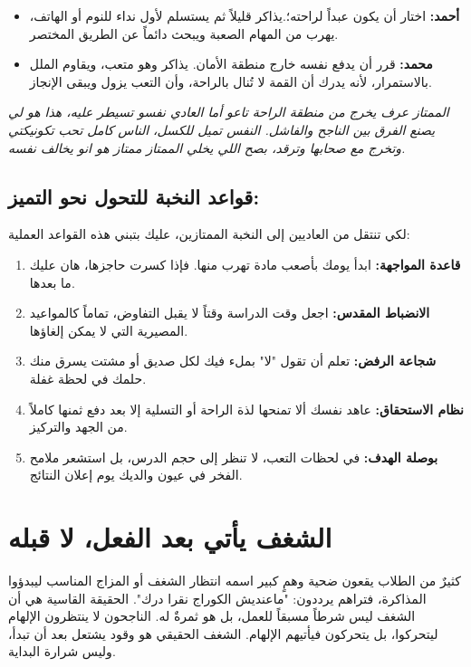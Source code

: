 \documentclass[12pt,a4paper]{book}
\newcommand{\quoteAr}[1]{%
	\begin{myquote}
		\itshape #1
	\end{myquote}
}
\begin{document}
	\begin{itemize}
		\item \textbf{أحمد:} اختار أن يكون عبداً لراحته؛.يذاكر قليلاً ثم يستسلم لأول نداء للنوم أو الهاتف، يهرب من المهام الصعبة ويبحث دائماً عن الطريق المختصر.
		\item \textbf{محمد:} قرر أن يدفع نفسه خارج منطقة الأمان. يذاكر وهو متعب، ويقاوم الملل بالاستمرار، لأنه يدرك أن القمة لا تُنال بالراحة، وأن التعب يزول ويبقى الإنجاز.
	\end{itemize}

		\quoteAr{الممتاز عرف يخرج من منطقة الراحة تاعو أما العادي نفسو تسيطر عليه، هذا هو لي يصنع الفرق بين الناجح والفاشل. النفس تميل للكسل، الناس كامل تحب تكونيكتي وتخرج مع صحابها وترقد، بصح اللي يخلي الممتاز ممتاز هو انو يخالف نفسه.}


	\subsection*{قواعد النخبة للتحول نحو التميز:}
	لكي تنتقل من  العاديين إلى النخبة الممتازين، عليك بتبني هذه القواعد العملية:
	
	\begin{enumerate}
		\item \textbf{قاعدة المواجهة:} ابدأ يومك بأصعب مادة تهرب منها. فإذا كسرت حاجزها، هان عليك ما بعدها.
		\item \textbf{الانضباط المقدس:} اجعل وقت الدراسة وقتاً لا يقبل التفاوض، تماماً كالمواعيد المصيرية التي لا يمكن إلغاؤها.
		\item \textbf{شجاعة الرفض:} تعلم أن تقول "لا" بملء فيك لكل صديق أو مشتت يسرق منك حلمك في لحظة غفلة.
		\item \textbf{نظام الاستحقاق:} عاهد نفسك ألا تمنحها لذة الراحة أو التسلية إلا بعد دفع ثمنها كاملاً من الجهد والتركيز.
		\item \textbf{بوصلة الهدف:} في لحظات التعب، لا تنظر إلى حجم الدرس، بل استشعر ملامح الفخر في عيون والديك يوم إعلان النتائج.
	\end{enumerate}
	
	\section{الشغف يأتي بعد الفعل، لا قبله}
	
	كثيرٌ من الطلاب يقعون ضحية وهمٍ كبير اسمه انتظار الشغف أو المزاج المناسب ليبدؤوا المذاكرة، فتراهم يرددون: "ماعنديش الكوراج نقرا درك". الحقيقة القاسية هي أن الشغف ليس شرطاً مسبقاً للعمل، بل هو ثمرةٌ له. الناجحون لا ينتظرون الإلهام ليتحركوا، بل يتحركون فيأتيهم الإلهام. الشغف الحقيقي هو وقود يشتعل بعد أن تبدأ، وليس شرارة البداية.
	
\end{document}

